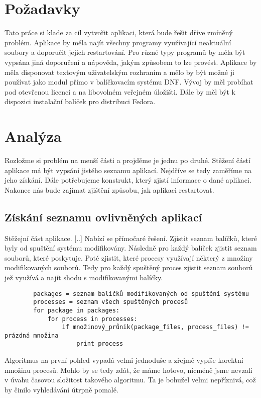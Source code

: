 \documentclass[10pt,a4paper]{article}
\begin{document}
	\section{Požadavky}
	Tato práce si klade za cíl vytvořit aplikaci, která bude řešit dříve zmíněný problém. Aplikace by měla najít všechny programy využívající neaktuální soubory a doporučit jejich restartování. Pro různé typy programů by měla být vypsána jiná doporučení a nápověda, jakým způsobem to lze provést. Aplikace by měla disponovat textovým uživatelským rozhraním a mělo by být možné ji používat jako modul přímo v balíčkovacím systému DNF\@. Vývoj by měl probíhat pod otevřenou licencí a na libovolném veřejném úložišti. Dále by měl být k dispozici instalační balíček pro distribuci Fedora.

	\section{Analýza}
	Rozložme si problém na menší části a projděme je jednu po druhé. Stěžení částí aplikace má být vypsání jistého seznamu aplikací. Nejdříve se tedy zaměříme na jeho získání. Dále potřebujeme konstrukt, který zjistí informace o  dané aplikaci. Nakonec nás bude zajímat zjištění způsobu, jak aplikaci restartovat.
	
		\subsection{Získání seznamu ovlivněných aplikací}
		Stěžejní část aplikace. [..] Nabízí se přímočaré řešení. Zjistit seznam balíčků, které byly od spuštění systému modifikovány. Následně pro každý balíček zjistit seznam souborů, které poskytuje. Poté zjistit, které procesy využívají některý z množiny modifikovaných souborů. Tedy pro každý spuštěný proces zjistit seznam souborů jež využívá a najít shodu s modifikovanými balíčky.
		
		\begin{verbatim}
		packages = seznam balíčků modifikovaných od spuštění systému
		processes = seznam všech spuštěných procesů
		for package in packages:
		    for process in processes:
		        if množinový_průnik(package_files, process_files) != prázdná množina
		            print process
		\end{verbatim}
		
		Algoritmus na první pohled vypadá velmi jednoduše a zřejmě vypíše korektní množinu procesů. Mohlo by se tedy zdát, že máme hotovo, nicméně jsme nevzali v úvahu časovou složitost takového algoritmu. Ta je bohužel velmi nepříznivá, což by činilo vyhledávání útrpně pomalé.
		
\end{document}
